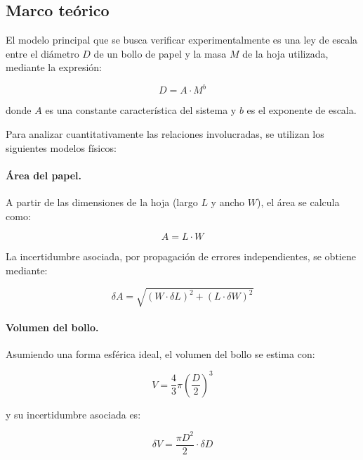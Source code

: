 \documentclass[12pt,a4]{article}
\begin{document}
\subsection{Marco teórico}

El modelo principal que se busca verificar experimentalmente es una ley de escala entre el diámetro \( D \) de un bollo de papel y la masa \( M \) de la hoja utilizada, mediante la expresión:

\begin{equation}
D = A \cdot M^b
\label{eq:ley_escala}
\end{equation}

donde \( A \) es una constante característica del sistema y \( b \) es el exponente de escala.

Para analizar cuantitativamente las relaciones involucradas, se utilizan los siguientes modelos físicos:

\paragraph{Área del papel.} A partir de las dimensiones de la hoja (largo \( L \) y ancho \( W \)), el área se calcula como:

\begin{equation}
A = L \cdot W
\label{eq:area}
\end{equation}

La incertidumbre asociada, por propagación de errores independientes, se obtiene mediante:

\begin{equation}
\delta A = \sqrt{(W \cdot \delta L)^2 + (L \cdot \delta W)^2}
\label{eq:delta_area}
\end{equation}

\paragraph{Volumen del bollo.} Asumiendo una forma esférica ideal, el volumen del bollo se estima con:

\begin{equation}
V = \frac{4}{3} \pi \left( \frac{D}{2} \right)^3
\label{eq:volumen}
\end{equation}

y su incertidumbre asociada es:

\begin{equation}
\delta V = \frac{\pi D^2}{2} \cdot \delta D
\label{eq:delta_volumen}
\end{equation}
\end{document}
